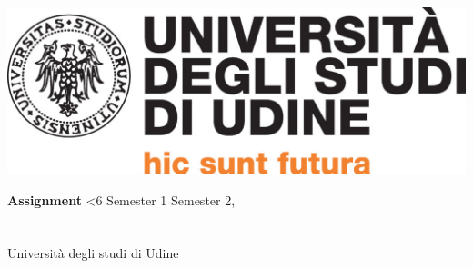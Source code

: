 \documentclass[a4paper,11pt]{article}
\newcommand{\semester}{\ifnum\month<6 Semester 1 \else Semester 2\fi}
\begin{document}

\begin{center}
  \includegraphics[width=\textwidth]{img/logo_uniud.jpg}
\end{center}

\vspace{2cm}
\Huge {\textbf{Assignment \getassignment}} \newline
\small \getunitcode \semester, \the\year\\[2cm]

\normalsize \textbf{\getstudentname} \\
\getstudentschool\\
Università degli studi di Udine

\vfill

\restoregeometry
{}
\pagestyle{plain}
\end{document}
